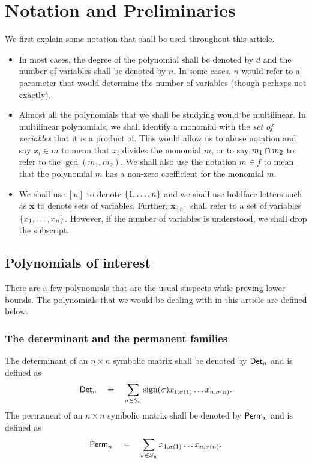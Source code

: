 \chapter{Notation and Preliminaries}\label{chap:notation}

We first explain some notation that shall be used throughout this article. 

\begin{itemize}
\item In most cases, the degree of the polynomial shall be denoted by $d$ and the number of variables shall be denoted by $n$. 
In some cases, $n$ would refer to a parameter that would determine the number of variables (though perhaps not exactly). 
\item Almost all the polynomials that we shall be studying would be multilinear. 
In multilinear polynomials, we shall identify a monomial with the \emph{set of variables} that it is a product of. 
This would allow us to abuse notation and say $x_i \in m$ to mean that $x_i$ divides the monomial $m$, or to say $m_1 \cap m_2$ to refer to the $\gcd(m_1,m_2)$. 
We shall also use the notation $m \in f$ to mean that the polynomial $m$ has a non-zero coefficient for the monomial $m$. 
\item We shall use $[n]$ to denote $\left\{1,\dots, n\right\}$ and we shall use boldface letters such as $\mathbf{x}$ to denote sets of variables. 
Further, $\mathbf{x}_{[n]}$ shall refer to a set of variables $\left\{x_1,\dots, x_n\right\}$. 
However, if the number of variables is understood, we shall drop the subscript. 
\end{itemize}


\section{Polynomials of interest}

There are a few polynomials that are the usual suspects while proving lower bounds. 
The polynomials that we would be dealing with in this article are defined below. 

\subsection*{The determinant and the permanent families}

The determinant of an $n\times n$ symbolic matrix shall be denoted by $\operatorname{\mathsf{Det}}_n$ and is defined as
\[
\operatorname{\mathsf{Det}}_n \quad = \quad \sum_{\sigma \in S_n} \text{sign}(\sigma) x_{1,\sigma(1)}\dots x_{n,\sigma(n)}.
\]
The permanent of an $n\times n$ symbolic matrix shall be denoted by $\operatorname{\mathsf{Perm}}_n$ and is defined as
\[
\operatorname{\mathsf{Perm}}_n \quad = \quad \sum_{\sigma \in S_n}x_{1,\sigma(1)}\dots x_{n,\sigma(n)}.
\]

